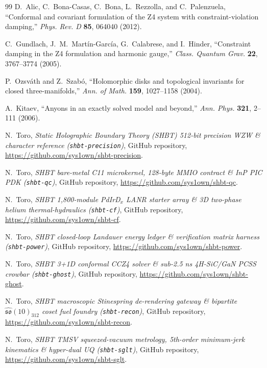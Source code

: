 \begin{thebibliography}{99}
D.~Alic, C.~Bona-Casas, C.~Bona, L.~Rezzolla, and C.~Palenzuela, ``Conformal and covariant formulation of the Z4 system with constraint-violation damping,'' \textit{Phys. Rev. D} \textbf{85}, 064040 (2012).

C.~Gundlach, J.~M.~Martín-García, G.~Calabrese, and I.~Hinder, ``Constraint damping in the Z4 formulation and harmonic gauge,'' \textit{Class. Quantum Grav.} \textbf{22}, 3767--3774 (2005).

P.~Ozsváth and Z.~Szabó, ``Holomorphic disks and topological invariants for closed three-manifolds,'' \textit{Ann. of Math.} \textbf{159}, 1027--1158 (2004).

A.~Kitaev, ``Anyons in an exactly solved model and beyond,'' \textit{Ann. Phys.} \textbf{321}, 2--111 (2006).

N.~Toro, \textit{Static Holographic Boundary Theory (SHBT) 512-bit precision WZW \& character reference (\texttt{shbt-precision})}, GitHub repository, \url{https://github.com/sys1own/shbt-precision}.

N.~Toro, \textit{SHBT bare-metal C11 microkernel, 128-byte MMIO contract \& InP PIC PDK (\texttt{shbt-qc})}, GitHub repository, \url{https://github.com/sys1own/shbt-qc}.

N.~Toro, \textit{SHBT 1,800-module PdIrD$_x$ LANR starter array \& 3D two-phase helium thermal-hydraulics (\texttt{shbt-cf})}, GitHub repository, \url{https://github.com/sys1own/shbt-cf}.

N.~Toro, \textit{SHBT closed-loop Landauer energy ledger \& verification matrix harness (\texttt{shbt-power})}, GitHub repository, \url{https://github.com/sys1own/shbt-power}.

N.~Toro, \textit{SHBT 3+1D conformal CCZ4 solver \& sub-2.5 ns 4H-SiC/GaN PCSS crowbar (\texttt{shbt-ghost})}, GitHub repository, \url{https://github.com/sys1own/shbt-ghost}.

N.~Toro, \textit{SHBT macroscopic Stinespring de-rendering gateway \& bipartite $\widehat{\mathfrak{so}}(10)_{312}$ coset fuel foundry (\texttt{shbt-recon})}, GitHub repository, \url{https://github.com/sys1own/shbt-recon}.

N.~Toro, \textit{SHBT TMSV squeezed-vacuum metrology, 5th-order minimum-jerk kinematics \& hyper-dual UQ (\texttt{shbt-sglt})}, GitHub repository, \url{https://github.com/sys1own/shbt-sglt}.


\end{thebibliography}
